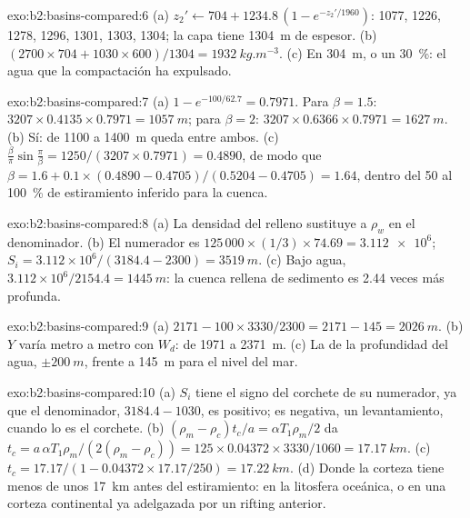 \begin{solution}{exo:b2:basins-compared:6}
(a) $z_2' \leftarrow 704 + 1234.8\,(1 - e^{-z_2'/1960})$: 1077, 1226, 1278, 1296, 1301, 1303,
1304; la capa tiene \qty{1304}{m} de espesor. (b) $(2700\times704 + 1030\times600)/1304 =
\qty{1932}{kg.m^{-3}}$. (c) En \qty{304}{m}, o un \qty{30}{\percent}: el agua que la compactación
ha expulsado.
\end{solution}

\begin{solution}{exo:b2:basins-compared:7}
(a) $1 - e^{-100/62.7} = 0.7971$. Para $\beta = 1.5$: $3207\times0.4135\times0.7971 =
\qty{1057}{m}$; para $\beta = 2$: $3207\times0.6366\times0.7971 = \qty{1627}{m}$. (b) Sí: de 1100 a
\qty{1400}{m} queda entre ambos. (c) $\frac{\beta}{\pi}\sin\frac{\pi}{\beta} = 1250/(3207\times0.7971)
= 0.4890$, de modo que $\beta = 1.6 + 0.1\times(0.4890 - 0.4705)/(0.5204 - 0.4705) = 1.64$, dentro del
50 al \qty{100}{\percent} de estiramiento inferido para la cuenca.
\end{solution}

\begin{solution}{exo:b2:basins-compared:8}
(a) La densidad del relleno sustituye a $\rho_w$ en el denominador. (b) El numerador es
$125\,000\times(1/3)\times74.69 = \num{3.112e6}$; $S_i = 3.112\times10^{6}/(3184.4 - 2300) =
\qty{3519}{m}$. (c) Bajo agua, $3.112\times10^{6}/2154.4 = \qty{1445}{m}$: la cuenca rellena de sedimento
es 2.44 veces más profunda.
\end{solution}

\begin{solution}{exo:b2:basins-compared:9}
(a) $2171 - 100\times3330/2300 = 2171 - 145 = \qty{2026}{m}$. (b) $Y$ varía metro a metro
con $W_d$: de 1971 a \qty{2371}{m}. (c) La de la profundidad del agua, $\pm\qty{200}{m}$, frente a
\qty{145}{m} para el nivel del mar.
\end{solution}

\begin{solution}{exo:b2:basins-compared:10}
(a) $S_i$ tiene el signo del corchete de su numerador, ya que el denominador, $3184.4 - 1030$, es
positivo; es negativa, un levantamiento, cuando lo es el corchete. (b) $(\rho_m - \rho_c)t_c/a =
\alpha T_1\rho_m/2$ da $t_c = a\,\alpha T_1\rho_m/(2(\rho_m - \rho_c)) = 125\times0.04372\times
3330/1060 = \qty{17.17}{km}$. (c) $t_c = 17.17/(1 - 0.04372\times17.17/250) = \qty{17.22}{km}$.
(d) Donde la corteza tiene menos de unos \qty{17}{km} antes del estiramiento: en la litosfera oceánica,
o en una corteza continental ya adelgazada por un rifting anterior.
\end{solution}

